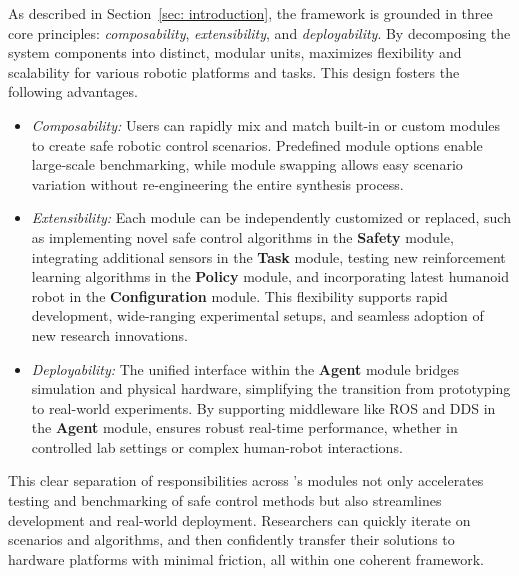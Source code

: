 As described in Section~\ref{sec: introduction}, the \spark framework is grounded in three core principles: \textit{composability}, \textit{extensibility}, and \textit{deployability}. By decomposing the system components into distinct, modular units, \spark maximizes flexibility and scalability for various robotic platforms and tasks. This design fosters the following advantages.

\begin{itemize}
    \item \textit{Composability:} Users can rapidly mix and match built-in or custom modules to create safe robotic control scenarios. 
    Predefined module options enable large-scale benchmarking, while module swapping allows easy scenario variation without re-engineering the entire synthesis process.
    \item \textit{Extensibility:} Each module can be independently customized or replaced, such as implementing novel safe control algorithms in the \textbf{Safety} module, integrating additional sensors in the \textbf{Task} module, testing new reinforcement learning algorithms in the \textbf{Policy} module, and incorporating latest humanoid robot in the \textbf{Configuration} module.
    This flexibility supports rapid development, wide-ranging experimental setups, and seamless adoption of new research innovations.
    \item \textit{Deployability:} The unified interface within the \textbf{Agent} module bridges simulation and physical hardware, simplifying the transition from prototyping to real-world experiments. 
    By supporting middleware like ROS and DDS in the \textbf{Agent} module, \spark ensures robust real-time performance, whether in controlled lab settings or complex human-robot interactions.
\end{itemize}

This clear separation of responsibilities across \spark's modules not only accelerates testing and benchmarking of safe control methods but also streamlines development and real-world deployment. Researchers can quickly iterate on scenarios and algorithms, and then confidently transfer their solutions to hardware platforms with minimal friction, all within one coherent framework.



